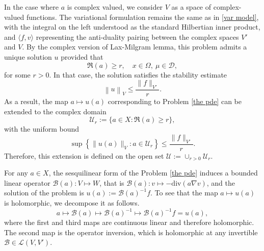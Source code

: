 \documentclass[12pt]{article}
\theoremstyle{remark}
\theoremstyle{definition}
\numberwithin{equation}{section}
\begin{document}
In the case where $a$ is complex valued, we consider $V$ as a space of complex-valued functions. The variational formulation remains the same as in \eqref{var model}, with the integral on the left understood as the standard Hilbertian inner product, and $\langle f, v\rangle$ representing the anti-duality pairing between the complex spaces $V'$ and $V$. By the complex version of Lax-Milgram lemma, this problem admits a unique solution $u$ provided that
\begin{equation}
    \mathfrak{R}(a) \geq r, \quad x\in \Omega, \ \mu \in \mathcal{D},
\end{equation}
for some $r>0$. In that case, the solution satisfies the stability estimate 
\begin{equation}
        \left\|u\right\|_V  \leq \frac{\|f\|_{V'}}{r}.
\end{equation}
As a result, the map $a \mapsto u(a)$ corresponding to Problem \eqref{the pde} can be extended to the complex domain
\begin{equation}
    \mathcal{U}_r:=\{a \in X: \mathfrak{R}(a) \geq r\},
\end{equation}
with the uniform bound
\begin{equation}
    \sup \left\{\|u(a)\|_V:a \in \mathcal{U}_r\right\} \leq \frac{\|f\|_{V'}}{r} .
\end{equation}
Therefore, this extension is defined on the open set $\mathcal{U} :=\cup_{r>0} \mathcal{U}_r .$

For any $a\in X$, the sesquilinear form of the Problem \eqref{the pde} induces a bounded linear operator $\mathcal{B}(a) : V \mapsto W$, that is $\mathcal{B}(a): v \mapsto -\text{div}(a \nabla v)$, and the solution of the problem is $u(a):=\mathcal{B}(a)^{-1} f$. To see that the map $a \mapsto u(a)$ is holomorphic, we decompose it as follows.
\begin{equation}
    a \mapsto \mathcal{B}(a) \mapsto \mathcal{B}(a)^{-1} \mapsto \mathcal{B}(a)^{-1} f=u(a),
\end{equation}
where the first and third maps are continuous linear and therefore holomorphic. The second map is the operator inversion, which is holomorphic at any invertible $\mathcal{B} \in \mathcal{L}(V,{V'})$.
\end{document}
